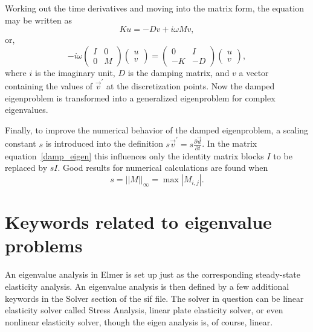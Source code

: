 Working out the time derivatives and moving into the matrix form, the
equation may be written as
\begin{equation}
Ku=-Dv+i\omega Mv,
\end{equation}
or,
\begin{equation}
\label{damp_eigen}
-i\omega\left(\begin{array}{cc}
I & 0 \\ 0 & M \end{array}\right) \left(\begin{array}{c}
u \\ v \end{array} \right) = \left(\begin{array}{cc}
0 & I \\ -K & -D \end{array}\right) \left(\begin{array}{c}
u \\ v\end{array} \right),
\end{equation}
where $i$ is the imaginary unit, $D$ is the damping matrix, and $v$ a
vector containing the values of $\vec{v}^{\prime}$ at the
discretization points. Now the damped eigenproblem is transformed into
a generalized eigenproblem for complex eigenvalues.

Finally, to improve the numerical behavior of the damped eigenproblem,
a scaling constant $s$ is introduced into the definition
$s\vec{v}^{\prime}=s\frac{\partial \vec{d}}{\partial t}$. In the
matrix equation~\ref{damp_eigen} this influences only the identity
matrix blocks $I$ to be replaced by $sI$. Good results for numerical
calculations are found when 
\begin{equation}
s = ||M||_\infty = \max |M_{i,j}|.
\end{equation}



\section{Keywords related to eigenvalue problems}

An eigenvalue analysis in Elmer is set up just as the corresponding
steady-state elasticity analysis. An eigenvalue analysis is then
defined by a few additional keywords in the Solver section of the sif
file. The solver in question can be linear elasticity solver called
Stress Analysis, linear plate elasticity solver, or even nonlinear
elasticity solver, though the eigen analysis is, of course,
linear. 

